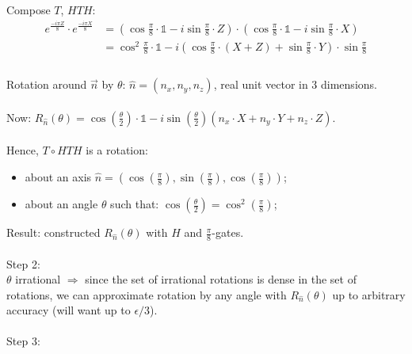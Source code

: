 Compose $T$, $HTH$:
\begin{align*}
e^{\frac{-i \pi Z}{8}} \cdot e^{\frac{-i \pi X}{8}} &= 
(\cos{\frac{\pi}{8}} \cdot \mathds{1} - i \sin{\frac{\pi}{8}} \cdot Z) \cdot (\cos{\frac{\pi}{8}} \cdot \mathds{1} - i \sin{\frac{\pi}{8}} \cdot X) \\
&= \cos^2{\frac{\pi}{8}} \cdot \mathds{1} - i (\cos{\frac{\pi}{8}} \cdot (X + Z) + \sin{\frac{\pi}{8} \cdot Y}) \cdot \sin{\frac{\pi}{8}} \\
\end{align*} \\
Rotation around $\overrightarrow{n}$ by $\theta$: 
$\hat{n} = (n_x, n_y, n_z)$, real unit vector in 3 dimensions. \\ \\
Now: $R_{\hat{n}}(\theta) = \cos(\frac{\theta}{2}) \cdot \mathds{1} - i \sin(\frac{\theta}{2})(n_x \cdot X + n_y \cdot Y + n_z \cdot Z)$.\\ 
\\
Hence, $T \circ HTH$ is a rotation:
\begin{itemize}
    \item about an axis $\hat{n} = (\cos(\frac{\pi}{8}), \sin(\frac{\pi}{8}), \cos(\frac{\pi}{8}))$;
    \item about an angle $\theta$ such that: $\cos(\frac{\theta}{2}) = \cos^2(\frac{\pi}{8})$;
\end{itemize}
Result: constructed $R_{\hat{n}}(\theta)$ with $H$ and $\frac{\pi}{8}$-gates.\\ \\
Step 2: \\

$\theta$ irrational $\Rightarrow$ since the set of irrational rotations is dense in the set of rotations, we can approximate rotation by any angle with $R_{\hat{n}}(\theta)$ up to arbitrary accuracy (will want up to $\epsilon / 3$). \\ \\
Step 3:\\

